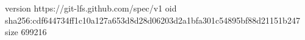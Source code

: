 version https://git-lfs.github.com/spec/v1
oid sha256:cdf644734ff1c10a127a653d8d28d06203d2a1bfa301c54895bf88d21151b247
size 699216
